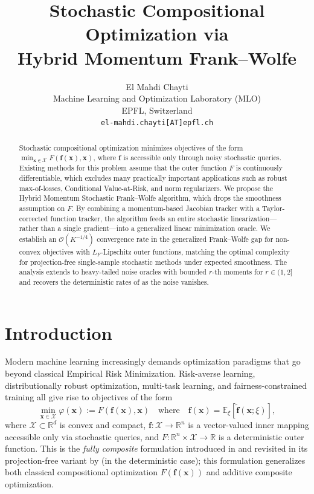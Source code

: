 \documentclass{article}
\title{Stochastic Compositional Optimization via \\ Hybrid Momentum Frank--Wolfe}
\author{%
  El Mahdi Chayti\\
  Machine Learning and Optimization Laboratory (MLO)\\
  EPFL, Switzerland\\
  \texttt{el-mahdi.chayti[AT]epfl.ch}
}
\newcommand{\cX}{\mathcal{X}}
\def\vf{{\bm{f}}}
\def\vx{{\bm{x}}}
\newcommand{\E}{\mathbb{E}}
\newcommand{\R}{\mathbb{R}}
\begin{document}
\maketitle

\begin{abstract}
Stochastic compositional optimization minimizes objectives of the form $\min_{\vx \in \cX} F(\vf(\vx), \vx)$, where $\vf$ is accessible only through noisy stochastic queries. Existing methods for this problem assume that the outer function $F$ is continuously differentiable, which excludes many practically important applications such as robust max-of-losses, Conditional Value-at-Risk, and norm regularizers. We propose the Hybrid Momentum Stochastic Frank--Wolfe algorithm, which drops the smoothness assumption on $F$. By combining a momentum-based Jacobian tracker with a Taylor-corrected function tracker, the algorithm feeds an entire stochastic linearization---rather than a single gradient---into a generalized linear minimization oracle. We establish an $\mathcal{O}(K^{-1/4})$ convergence rate in the generalized Frank--Wolfe gap for non-convex objectives with $L_F$-Lipschitz outer functions, matching the optimal complexity for projection-free single-sample stochastic methods under expected smoothness. The analysis extends to heavy-tailed noise oracles with bounded $r$-th moments for $r \in (1, 2]$ and recovers the deterministic rates of \citet{vladarean2023first} as the noise vanishes.
\end{abstract}

\section{Introduction}

Modern machine learning increasingly demands optimization paradigms that go beyond classical Empirical Risk Minimization. Risk-averse learning, distributionally robust optimization, multi-task learning, and fairness-constrained training all give rise to objectives of the form
\begin{equation}
    \min_{\vx \in \cX} \varphi(\vx) := F(\vf(\vx), \vx) \quad \text{where} \quad \vf(\vx) = \E_{\xi}[\tilde{\vf}(\vx; \xi)], \label{eq:problem}
\end{equation}
where $\cX \subset \R^d$ is convex and compact, $\vf : \cX \to \R^n$ is a vector-valued inner mapping accessible only via stochastic queries, and $F : \R^n \times \cX \to \R$ is a deterministic outer function. This is the \emph{fully composite} formulation introduced in  \citet{doikov2022high} and revisited in its projection-free variant by \citep{vladarean2023first} (in the deterministic case); this formulation generalizes both classical compositional optimization $F(\vf(\vx))$ and additive composite optimization.
\end{document}
